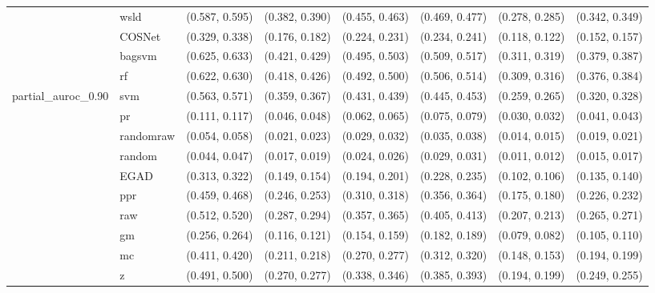 \begin{table}[H]
{\begin{tabular}{llllllll}
 & wsld & (0.587, 0.595) & (0.382, 0.390) & (0.455, 0.463) & (0.469, 0.477) & (0.278, 0.285) & (0.342, 0.349)\\

 & COSNet & (0.329, 0.338) & (0.176, 0.182) & (0.224, 0.231) & (0.234, 0.241) & (0.118, 0.122) & (0.152, 0.157)\\

 & bagsvm & (0.625, 0.633) & (0.421, 0.429) & (0.495, 0.503) & (0.509, 0.517) & (0.311, 0.319) & (0.379, 0.387)\\

 & rf & (0.622, 0.630) & (0.418, 0.426) & (0.492, 0.500) & (0.506, 0.514) & (0.309, 0.316) & (0.376, 0.384)\\

\multirow{-15}{*}{\raggedright\arraybackslash partial\_auroc\_0.90} & svm & (0.563, 0.571) & (0.359, 0.367) & (0.431, 0.439) & (0.445, 0.453) & (0.259, 0.265) & (0.320, 0.328)\\
\cmidrule{1-8}
 & pr & (0.111, 0.117) & (0.046, 0.048) & (0.062, 0.065) & (0.075, 0.079) & (0.030, 0.032) & (0.041, 0.043)\\

 & randomraw & (0.054, 0.058) & (0.021, 0.023) & (0.029, 0.032) & (0.035, 0.038) & (0.014, 0.015) & (0.019, 0.021)\\

 & random & (0.044, 0.047) & (0.017, 0.019) & (0.024, 0.026) & (0.029, 0.031) & (0.011, 0.012) & (0.015, 0.017)\\

 & EGAD & (0.313, 0.322) & (0.149, 0.154) & (0.194, 0.201) & (0.228, 0.235) & (0.102, 0.106) & (0.135, 0.140)\\

 & ppr & (0.459, 0.468) & (0.246, 0.253) & (0.310, 0.318) & (0.356, 0.364) & (0.175, 0.180) & (0.226, 0.232)\\

 & raw & (0.512, 0.520) & (0.287, 0.294) & (0.357, 0.365) & (0.405, 0.413) & (0.207, 0.213) & (0.265, 0.271)\\

 & gm & (0.256, 0.264) & (0.116, 0.121) & (0.154, 0.159) & (0.182, 0.189) & (0.079, 0.082) & (0.105, 0.110)\\

 & mc & (0.411, 0.420) & (0.211, 0.218) & (0.270, 0.277) & (0.312, 0.320) & (0.148, 0.153) & (0.194, 0.199)\\

 & z & (0.491, 0.500) & (0.270, 0.277) & (0.338, 0.346) & (0.385, 0.393) & (0.194, 0.199) & (0.249, 0.255)\\


\end{tabular}}
\end{table}
